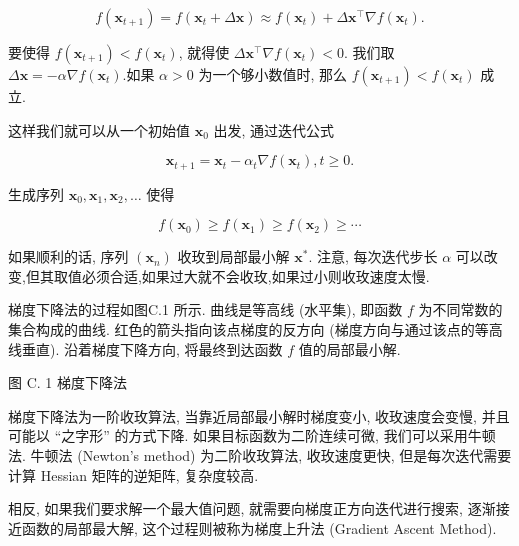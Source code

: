 \documentclass[10pt]{article}
\begin{document}
\begin{equation*}
f\left(\boldsymbol{x}_{t+1}\right)=f\left(\boldsymbol{x}_{t}+\Delta \boldsymbol{x}\right) \approx f\left(\boldsymbol{x}_{t}\right)+\Delta \boldsymbol{x}^{\top} \nabla f\left(\boldsymbol{x}_{t}\right) . \tag{C.7}
\end{equation*}


要使得 $f\left(\boldsymbol{x}_{t+1}\right)<f\left(\boldsymbol{x}_{t}\right)$, 就得使 $\Delta \boldsymbol{x}^{\top} \nabla f\left(\boldsymbol{x}_{t}\right)<0$. 我们取 $\Delta \boldsymbol{x}=-\alpha \nabla f\left(\boldsymbol{x}_{t}\right)$.如果 $\alpha>0$ 为一个够小数值时, 那么 $f\left(\boldsymbol{x}_{t+1}\right)<f\left(\boldsymbol{x}_{t}\right)$ 成立.

这样我们就可以从一个初始值 $\boldsymbol{x}_{0}$ 出发, 通过迭代公式


\begin{equation*}
\boldsymbol{x}_{t+1}=\boldsymbol{x}_{t}-\alpha_{t} \nabla f\left(\boldsymbol{x}_{t}\right), t \geq 0 . \tag{C.8}
\end{equation*}


生成序列 $\boldsymbol{x}_{0}, \boldsymbol{x}_{1}, \boldsymbol{x}_{2}, \ldots$ 使得


\begin{equation*}
f\left(\boldsymbol{x}_{0}\right) \geq f\left(\boldsymbol{x}_{1}\right) \geq f\left(\boldsymbol{x}_{2}\right) \geq \cdots \tag{C.9}
\end{equation*}


如果顺利的话, 序列 $\left(\boldsymbol{x}_{n}\right)$ 收玫到局部最小解 $\boldsymbol{x}^{*}$. 注意, 每次迭代步长 $\alpha$ 可以改变,但其取值必须合适,如果过大就不会收玫,如果过小则收玫速度太慢.

梯度下降法的过程如图C.1 所示. 曲线是等高线 (水平集), 即函数 $f$ 为不同常数的集合构成的曲线. 红色的箭头指向该点梯度的反方向 (梯度方向与通过该点的等高线垂直). 沿着梯度下降方向, 将最终到达函数 $f$ 值的局部最小解.



图 C. 1 梯度下降法

梯度下降法为一阶收玫算法, 当靠近局部最小解时梯度变小, 收玫速度会变慢, 并且可能以 “之字形” 的方式下降. 如果目标函数为二阶连续可微, 我们可以采用牛顿法. 牛顿法 (Newton's method) 为二阶收玫算法, 收玫速度更快, 但是每次迭代需要计算 Hessian 矩阵的逆矩阵, 复杂度较高.

相反, 如果我们要求解一个最大值问题, 就需要向梯度正方向迭代进行搜索, 逐渐接近函数的局部最大解, 这个过程则被称为梯度上升法 (Gradient Ascent Method).
\end{document}
